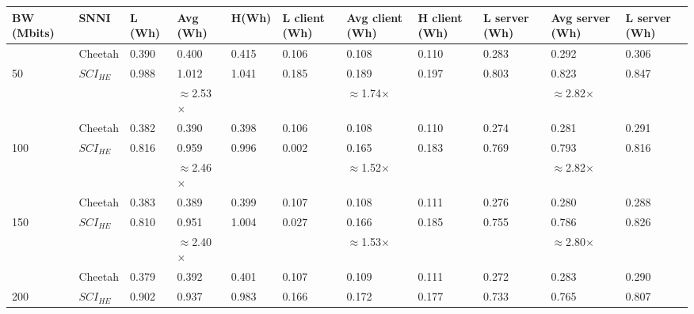 \begin{tabular}{lllllllllll}
BW (Mbits) & SNNI    & L (Wh) & Avg (Wh) & H(Wh) & L client (Wh) & Avg client (Wh) & H client (Wh) & L server (Wh) & Avg server (Wh) & L server (Wh) \\ \hline
           & Cheetah & 0.390  & 0.400    & 0.415 & 0.106         & 0.108           & 0.110         & 0.283         & 0.292           & 0.306         \\
50         & $SCI_{HE}$ & 0.988  & 1.012    & 1.041 & 0.185         & 0.189           & 0.197         & 0.803         & 0.823           & 0.847         \\ \cline{3-11} 
           &         &        & $\approx$2.53$\times$    &       &               & $\approx$1.74$\times$           &               &               & $\approx$2.82$\times$         &               \\ \hline
           & Cheetah & 0.382  & 0.390    & 0.398 & 0.106         & 0.108           & 0.110         & 0.274         & 0.281           & 0.291         \\
100        & $SCI_{HE}$ & 0.816  & 0.959    & 0.996 & 0.002         & 0.165           & 0.183         & 0.769         & 0.793           & 0.816         \\ \cline{3-11} 
           &         &        & $\approx$2.46$\times$    &       &               & $\approx$1.52$\times$           &               &               & $\approx$2.82$\times$           &               \\ \hline
           & Cheetah & 0.383  & 0.389    & 0.399 & 0.107         & 0.108           & 0.111         & 0.276         & 0.280           & 0.288         \\
150        & $SCI_{HE}$ & 0.810  & 0.951    & 1.004 & 0.027         & 0.166           & 0.185         & 0.755         & 0.786           & 0.826         \\ \cline{3-11} 
           &         &        & $\approx$2.40$\times$    &       &               & $\approx$1.53$\times$           &               &               & $\approx$2.80$\times$           &               \\ \hline
           & Cheetah & 0.379  & 0.392    & 0.401 & 0.107         & 0.109           & 0.111         & 0.272         & 0.283           & 0.290         \\
200        & $SCI_{HE}$ & 0.902  & 0.937    & 0.983 & 0.166         & 0.172           & 0.177         & 0.733         & 0.765           & 0.807         \\ \cline{3-11} 

\end{tabular}
